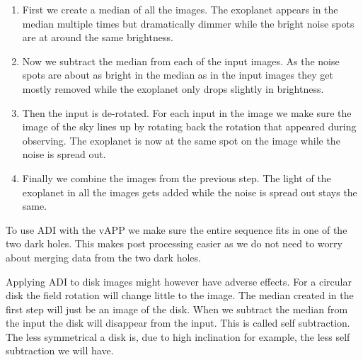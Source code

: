 \begin{enumerate}
    \item First we create a median of all the images. The exoplanet appears in the median multiple times but dramatically dimmer while the bright noise spots are at around the same brightness.
    \item Now we subtract the median from each of the input images. As the noise spots are about as bright in the median as in the input images they get mostly removed while the exoplanet only drops slightly in brightness. 
    \item Then the input is de-rotated. For each input in the image we make sure the image of the sky lines up by rotating back the rotation that appeared during observing. The exoplanet is now at the same spot on the image while the noise is spread out.
    \item Finally we combine the images from the previous step. The light of the exoplanet in all the images gets added while the noise is spread out stays the same.
\end{enumerate}

To use \ac{ADI} with the \ac{vAPP} we make sure the entire sequence fits in one of the two dark holes. This makes post processing easier as we do not need to worry about merging data from the two dark holes. 

Applying \ac{ADI} to disk images might however have adverse effects. For a circular disk the field rotation will change little to the image. The median created in the first step will just be an image of the disk. When we subtract the median from the input the disk will disappear from the input. This is called self subtraction. The less symmetrical a disk is, due to high inclination for example, the less self subtraction we will have.
